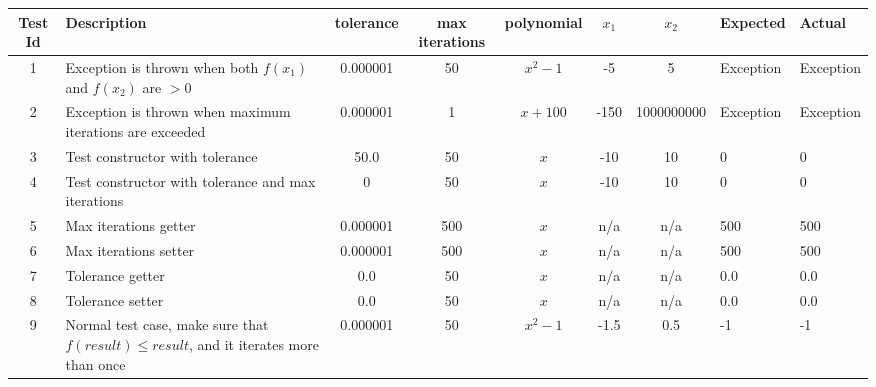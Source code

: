 \begin{adjustbox}{center}
	\begin{tabularx}{0.9\paperwidth}{c X c c c c c l l}
		Test Id & Description                                                                              & tolerance & max iterations & polynomial & $x_1$ & $x_2$      & Expected  & Actual    \\ \hline
		1       & Exception is thrown when both $f(x_1)$ and $f(x_2)$ are $> 0$                            & 0.000001  & 50             & $x^2 - 1$  & -5    & 5          & Exception & Exception \\\hline
		2       & Exception is thrown when maximum iterations are exceeded                                 & 0.000001  & 1              & $x+100$    & -150  & 1000000000 & Exception & Exception \\\hline
		3       & Test constructor with tolerance                                                          & 50.0      & 50             & $x$        & -10   & 10         & 0         & 0         \\\hline
		4       & Test constructor with tolerance and max iterations                                       & 0         & 50             & $x$        & -10   & 10         & 0         & 0         \\\hline
		5       & Max iterations getter                                                                    & 0.000001  & 500            & $x$        & n/a   & n/a        & 500       & 500       \\\hline
		6       & Max iterations setter                                                                    & 0.000001  & 500            & $x$        & n/a   & n/a        & 500       & 500       \\\hline
		7       & Tolerance getter                                                                         & 0.0       & 50             & $x$        & n/a   & n/a        & 0.0       & 0.0       \\\hline
		8       & Tolerance setter                                                                         & 0.0       & 50             & $x$        & n/a   & n/a        & 0.0       & 0.0       \\\hline
		9       & Normal test case, make sure that $f(result) \leq result$, and it iterates more than once & 0.000001  & 50             & $x^2 -1$   & -1.5  & 0.5        & -1        & -1
	\end{tabularx}%
\end{adjustbox}
\vspace{1cm}

